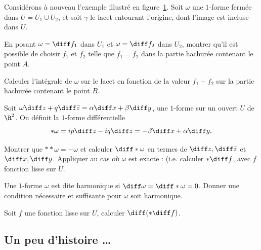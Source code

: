 \begin{exer}
\begin{figure}[H]
\begin{center}
\begin{tikzpicture}[line cap=round,line join=round,>=triangle 45,x=1.0cm,y=1.0cm, scale=0.5]
\end{tikzpicture}
\end{center}
\caption{} \label{fig:exer3_3}
\end{figure}
\end{exer}

\begin{exer}\label{exer:recollement}
Considérons à nouveau l'exemple illustré en figure~\ref{fig:exer3_3}. Soit $\omega$ une $1$-forme fermée dans $U=U_1 \cup U_2$, et soit $ \gamma$ le lacet entourant l'origine, dont l'image est incluse dans $U$. 
\begin{MYenumerate}
\item En posant $\omega=\diff f_1$ dans $U_1$ et $\omega=\diff f_2$ dans $U_2$, montrer qu'il est possible de choisir $f_1$ et $f_2$ telle que $f_1=f_2$ dans la partie hachurée contenant le point $A$.
\item Calculer l'intégrale de $\omega$ sur le lacet en fonction de la valeur $f_1 -f_2$ sur la partie hachurée contenant le point $B$.
\end{MYenumerate}
\end{exer}




\begin{exer}
Soit $\omega \diff z + q \diff \bar{z} = \alpha \diff x + \beta \diff y$, une $1$-forme sur un ouvert $U$ de $\R^2$. On définit la $1$-forme différentielle
\[\ast \omega = i p\diff z - i q \diff \bar{z} = -\beta \diff x + \alpha \diff y.\]
\begin{MYenumerate}
\item Montrer que $**\omega=-\omega$ et calculer $\diff \ast \omega$ en termes de $\diff z, \diff \bar{z}$ et $\diff x, \diff y$. Appliquer au cas où $\omega$ est exacte : (i.e. calculer $\ast \diff f$, avec $f$ fonction lisse sur $U$.
\item Une $1$-forme $\omega$ est dite harmonique si $\diff \omega=\diff \ast \omega=0$. Donner une condition nécessaire et suffisante pour $\omega$ soit harmonique.
\item Soit $f$ une fonction lisse sur $U$, calculer $\diff (\ast \diff f)$.

\end{MYenumerate}



\end{exer}

\newpage 
\subsection*{Un peu d'histoire \dots}

